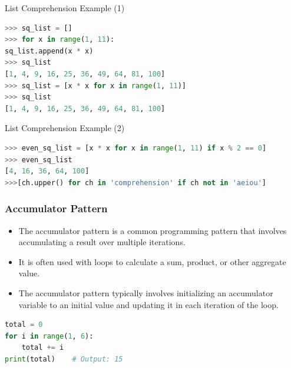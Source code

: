 \begin{frame}[fragile]{List Comprehension Example (1)}
    \begin{lstlisting}[language=Python]
>>> sq_list = []
>>> for x in range(1, 11):
sq_list.append(x * x)
>>> sq_list
[1, 4, 9, 16, 25, 36, 49, 64, 81, 100]
>>> sq_list = [x * x for x in range(1, 11)]
>>> sq_list
[1, 4, 9, 16, 25, 36, 49, 64, 81, 100]
    \end{lstlisting}
\end{frame}

\begin{frame}[fragile]{List Comprehension Example (2)}
    \begin{lstlisting}[language=Python]
>>> even_sq_list = [x * x for x in range(1, 11) if x % 2 == 0]
>>> even_sq_list
[4, 16, 36, 64, 100]
>>>[ch.upper() for ch in 'comprehension' if ch not in 'aeiou']
    \end{lstlisting}
\end{frame}

\begin{frame}[fragile]
\frametitle{Accumulator Pattern}
\begin{itemize}
    \item The accumulator pattern is a common programming pattern that involves accumulating a result over multiple iterations.
    \item It is often used with loops to calculate a sum, product, or other aggregate value.
    \item The accumulator pattern typically involves initializing an accumulator variable to an initial value and updating it in each iteration of the loop.
\end{itemize}
 \begin{lstlisting}[language=Python]
total = 0
for i in range(1, 6):
    total += i
print(total)    # Output: 15            
\end{lstlisting}
\end{frame}

